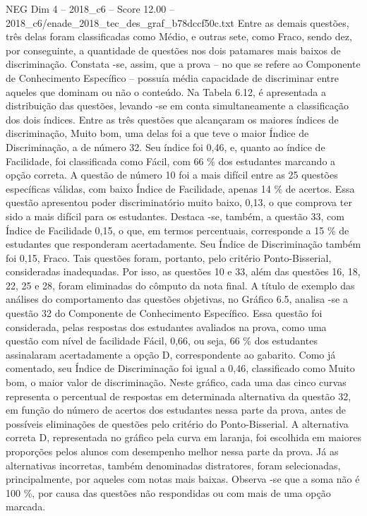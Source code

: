 \begin{textsample}{NEG Dim 4 – 2018\_c6 – Score 12.00 – 2018\_c6/enade\_2018\_tec\_des\_graf\_b78dccf50c.txt}
Entre as demais questões, três delas foram classificadas como Médio, e outras sete, como Fraco, sendo dez, por conseguinte, a quantidade de questões nos dois patamares mais baixos de discriminação.
Constata -se, assim, que a prova – no que se refere ao Componente de Conhecimento Específico – possuía média capacidade de discriminar entre aqueles que dominam ou não o conteúdo.
Na Tabela 6.12, é apresentada a distribuição das questões, levando -se em conta simultaneamente a classificação dos dois índices.
Entre as três questões que alcançaram os maiores índices de discriminação, Muito bom, uma delas foi a que teve o maior Índice de Discriminação, a de número 32.
Seu índice foi 0,46, e, quanto ao índice de Facilidade, foi classificada como Fácil, com 66 \% dos estudantes marcando a opção correta.
A questão de número 10 foi a mais difícil entre as 25 questões específicas válidas, com baixo Índice de Facilidade, apenas 14 \% de acertos.
Essa questão apresentou poder discriminatório muito baixo, 0,13, o que comprova ter sido a mais difícil para os estudantes.
Destaca -se, também, a questão 33, com Índice de Facilidade 0,15, o que, em termos percentuais, corresponde a 15 \% de estudantes que responderam acertadamente.
Seu Índice de Discriminação também foi 0,15, Fraco.
Tais questões foram, portanto, pelo critério Ponto-Bisserial, consideradas inadequadas.
Por isso, as questões 10 e 33, além das questões 16, 18, 22, 25 e 28, foram eliminadas do cômputo da nota final.
A título de exemplo das análises do comportamento das questões objetivas, no Gráfico 6.5, analisa -se a questão 32 do Componente de Conhecimento Específico.
Essa questão foi considerada, pelas respostas dos estudantes avaliados na prova, como uma questão com nível de facilidade Fácil, 0,66, ou seja, 66 \% dos estudantes assinalaram acertadamente a opção D, correspondente ao gabarito.
Como já comentado, seu Índice de Discriminação foi igual a 0,46, classificado como Muito bom, o maior valor de discriminação.
Neste gráfico, cada uma das cinco curvas representa o percentual de respostas em determinada alternativa da questão 32, em função do número de acertos dos estudantes nessa parte da prova, antes de possíveis eliminações de questões pelo critério do Ponto-Bisserial.
A alternativa correta D, representada no gráfico pela curva em laranja, foi escolhida em maiores proporções pelos alunos com desempenho melhor nessa parte da prova.
Já as alternativas incorretas, também denominadas distratores, foram selecionadas, principalmente, por aqueles com notas mais baixas.
Observa -se que a soma não é 100 \%, por causa das questões não respondidas ou com mais de uma opção marcada.

\end{textsample}
